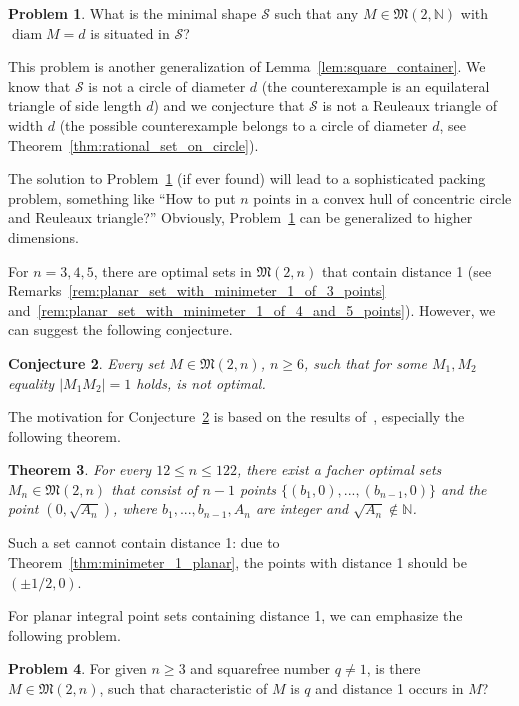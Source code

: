 \documentclass[a4paper,14pt]{article} %
\theoremstyle{plain}
\newtheorem{theorem}{Theorem}[section]
\newtheorem{conjecture}[theorem]{Conjecture}
\theoremstyle{definition}
\newtheorem{problem}[theorem]{Problem}
\begin{document}
\begin{problem}
	\label{prb:minimal_shape}
	What is the minimal shape $\mathcal{S}$ such that any $M\in\mathfrak{M}(2,\mathbb{N})$ with $\operatorname{diam} M = d$
	is situated in  $\mathcal{S}$?
\end{problem}
This problem is another generalization of Lemma~\ref{lem:square_container}.
We know that $\mathcal{S}$ is not a circle of diameter $d$
(the counterexample is an equilateral triangle of side length $d$)
and we conjecture that $\mathcal{S}$ is not a Reuleaux triangle of width $d$
(the possible counterexample belongs to a circle of diameter $d$, see Theorem~\ref{thm:rational_set_on_circle}).

The solution to Problem~\ref{prb:minimal_shape} (if ever found) will lead to a sophisticated packing problem,
something like ``How to put $n$ points in a convex hull of concentric circle and Reuleaux triangle?''
Obviously, Problem~\ref{prb:minimal_shape} can be generalized to higher dimensions.


For $n=3,4,5$, there are optimal sets in $\mathfrak{M}(2,n)$ that contain distance 1
(see Remarks~\ref{rem:planar_set_with_minimeter_1_of_3_points} and~\ref{rem:planar_set_with_minimeter_1_of_4_and_5_points}).
However, we can suggest the following conjecture.
\begin{conjecture}
	\label{con:no_optimal_with_edge_1}
	Every set $M\in\mathfrak{M}(2,n)$, $n\geq 6$, such that for some $M_1,M_2$ equality $|M_1 M_2|=1$ holds,
	is not optimal.
\end{conjecture}

The motivation for Conjecture~\ref{con:no_optimal_with_edge_1} is based on the results of~\cite[Section 5]{kurz2008minimum},
especially the following theorem.

\begin{theorem}
	For every $12 \leq n \leq 122$, there exist a facher optimal sets $M_n\in\mathfrak{M}(2,n)$
	that consist of $n-1$ points $\{ (b_1,0), ..., (b_{n-1},0)\}$
	and the point $(0,\sqrt{A_n})$,
	where $b_1,...,b_{n-1}, A_n$ are integer and $\sqrt{A_n}\notin\mathbb{N}$.
\end{theorem}
Such a set cannot contain distance 1: due to Theorem~\ref{thm:minimeter_1_planar},
the points with distance 1 should be $(\pm 1/2, 0)$.

For planar integral point sets containing distance 1, we can emphasize the following problem.
\begin{problem}
	For given $n\geq 3$ and squarefree number $q \neq 1$,
	is there $M\in\mathfrak{M}(2,n)$, such that characteristic of $M$ is $q$
	and distance 1 occurs in $M$?
\end{problem}
\end{document}
